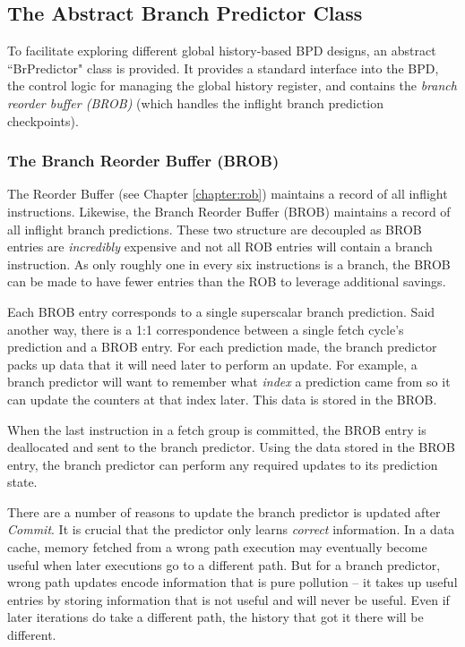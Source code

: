 \subsection{The Abstract Branch Predictor Class}

To facilitate exploring different global history-based BPD designs, an abstract ``BrPredictor" class is provided.  It provides a standard interface into the BPD, the control logic for managing the global history register, and contains the {\em branch reorder buffer (BROB)} (which handles the inflight branch prediction checkpoints).

\subsubsection{The Branch Reorder Buffer (BROB)}

The Reorder Buffer (see Chapter \ref{chapter:rob}) maintains a record of all inflight instructions. Likewise, the Branch Reorder Buffer (BROB) maintains a record of all inflight branch predictions.  These two structure are decoupled as BROB entries are {\em incredibly} expensive and not all ROB entries will contain a branch instruction. As only roughly one in every six instructions is a branch, the BROB can be made to have fewer entries than the ROB to leverage additional savings.

Each BROB entry corresponds to a single superscalar branch prediction. Said another way, there is a 1:1 correspondence between a single fetch cycle's prediction and a BROB entry.  
For each prediction made, the branch predictor packs up data that it will need later to perform an update. For example, a branch predictor will want to remember what {\em index} a prediction came from so it can update the counters at that index later. This data is stored in the BROB. 

When the last instruction in a fetch group is committed, the BROB entry is deallocated and sent to the branch predictor.  Using the data stored in the BROB entry, the branch predictor can perform any required updates to its prediction state. 

There are a number of reasons to update the branch predictor is updated after {\em Commit}. It is crucial that the predictor only learns {\em correct} information. In a data cache, memory fetched from a wrong path execution may eventually become useful when later executions go to a different path.  But for a branch predictor, wrong path updates encode information that is pure pollution -- it takes up useful entries by storing information that is not useful and will never be useful.  Even if later iterations do take a different path, the history that got it there will be different.


